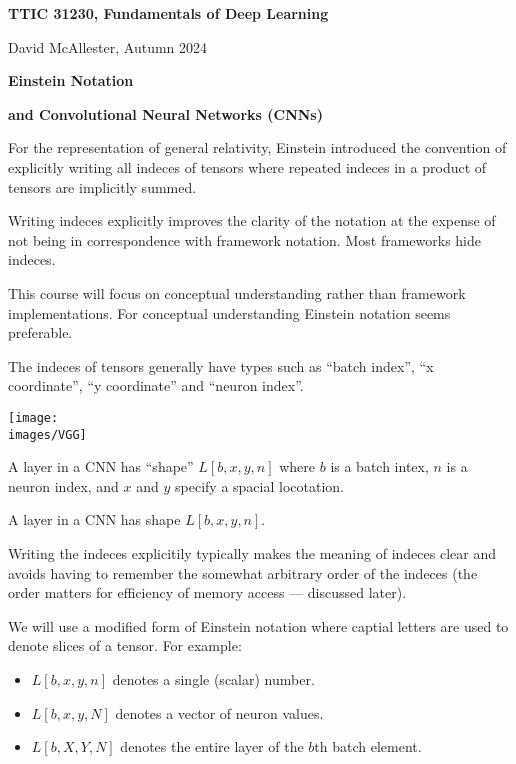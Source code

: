 




{\Huge

  \centerline{\bf TTIC 31230, Fundamentals of Deep Learning}
  \bigskip
  \centerline{David McAllester, Autumn 2024}

    \vfill
  \centerline{\bf Einstein Notation}
  \vfill
  \centerline{\bf and Convolutional Neural Networks (CNNs)}
  \vfill


For the representation of general relativity, Einstein introduced the convention of explicitly writing all indeces of tensors where repeated indeces in a product of tensors are implicitly summed.

\vfill
Writing indeces explicitly improves the clarity of the notation at the expense of not being in correspondence with framework notation.  Most frameworks hide indeces.

\vfill
This course will focus on conceptual understanding rather than framework implementations.  For conceptual understanding Einstein notation seems preferable.


The indeces of tensors generally have types such as ``batch index'', ``x coordinate'', ``y coordinate'' and  ``neuron index''.

\vfill
\centerline{\texttt{[image: \\images/VGG]}}

\vfill
A layer in a CNN has ``shape'' {\color{red} $L[b,x,y,n]$} where $b$ is a batch intex, $n$ is a neuron index, and $x$ and $y$ specify a spacial locotation.


A layer in a CNN has shape $L[b,x,y,n]$.

\vfill
Writing the indeces explicitily typically makes the meaning of indeces clear and avoids having to remember the somewhat arbitrary order of the indeces (the order matters for
efficiency of memory access --- discussed later).


\vfill
We will use a modified form of Einstein notation where captial letters are used to denote slices of a tensor.  For example:

\vfill
\begin{itemize}

\item $L[b,x,y,n]$ denotes a single (scalar) number.
\vfill
\item $L[b,x,y,N]$ denotes a vector of neuron values.
\vfill
\item $L[b,X,Y,N]$ denotes the entire layer of the $b$th batch element.
\end{itemize}

}
